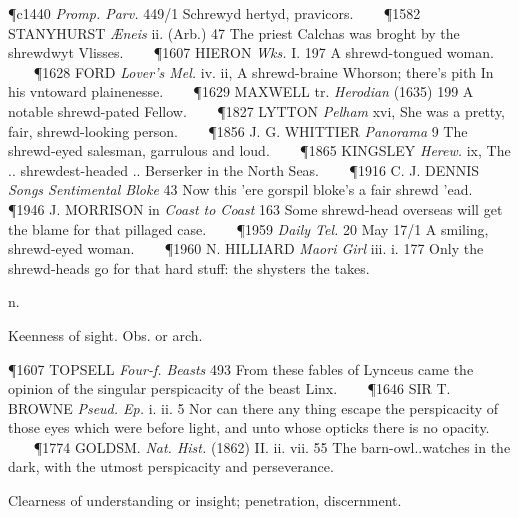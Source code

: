 \begin{description}[wide, labelwidth=!, labelindent=0pt]
\begin{myenumerate}
\P c1440  \textit{Promp. Parv.} 449/1 Schrewyd hertyd, pravicors.    
\P 1582 STANYHURST  \textit{Æneis} ii. (Arb.) 47 The priest Calchas was broght by the shrewdwyt Vlisses.    
\P 1607 HIERON  \textit{Wks.} I. 197 A shrewd-tongued woman.    
\P 1628 FORD  \textit{Lover's Mel.} iv. ii, A shrewd-braine Whorson; there's pith In his vntoward plainenesse.    
\P 1629 MAXWELL tr.  \textit{Herodian} (1635) 199 A notable shrewd-pated Fellow.    
\P 1827 LYTTON  \textit{Pelham} xvi, She was a pretty, fair, shrewd-looking person.    
\P 1856 J. G. WHITTIER  \textit{Panorama} 9 The shrewd-eyed salesman, garrulous and loud.    
\P 1865 KINGSLEY  \textit{Herew.} ix, The .. shrewdest-headed .. Berserker in the North Seas.    
\P 1916 C. J. DENNIS  \textit{Songs Sentimental Bloke} 43 Now this 'ere gorspil bloke's a fair shrewd 'ead.    
\P 1946 J. MORRISON in  \textit{Coast to Coast} 163 Some shrewd-head overseas will get the blame for that pillaged case.    
\P 1959  \textit{Daily Tel.} 20 May 17/1 A smiling, shrewd-eyed woman.    
\P 1960 N. HILLIARD  \textit{Maori Girl} iii. i. 177 Only the shrewd-heads go for that hard stuff: the shysters the takes.
\end{myenumerate}


 n.

\noindent {}

\vspace{-0.3cm}

\begin{myenumerate}

 Keenness of sight. Obs. or arch.

\P 1607 TOPSELL  \textit{Four-f. Beasts} 493 From these fables of Lynceus came the opinion of the singular perspicacity of the beast Linx.    
\P 1646 SIR T. BROWNE  \textit{Pseud. Ep.} i. ii. 5 Nor can there any thing escape the perspicacity of those eyes which were before light, and unto whose opticks there is no opacity.    
\P 1774 GOLDSM.  \textit{Nat. Hist.} (1862) II. ii. vii. 55 The barn-owl..watches in the dark, with the utmost perspicacity and perseverance.

 Clearness of understanding or insight; penetration, discernment.


\end{myenumerate}
\end{description}

